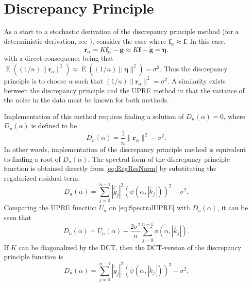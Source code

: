 \documentclass[12pt,notitlepage]{report}
\newcommand{\gnoise}{\widetilde{g}}	%
\newcommand{\gnoiseVec}{\widetilde{\mathbf{g}}}	%
\newcommand{\kMat}{K}	%
\newcommand{\fVec}{\mathbf{f}}	%
\newcommand{\dct}[1]{\breve{#1}}	%
\newcommand{\regparam}{\alpha}
\newcommand{\regf}{\fVec_{\regparam}}	%
\newcommand{\filt}{\phi}
\newcommand{\mfilt}{\psi}
\newcommand{\noise}{\eta}	%
\newcommand{\noiseSD}{\sigma}	%
\newcommand{\noiseVec}{\bm{\noise}}	%
\DeclareMathOperator{\E}{E}	%
\newcommand{\regres}{\mathbf{r}_{\regparam}}	%
\newcommand{\U}{U}	%
\newcommand{\D}{D}	%
\begin{document}
\section{Discrepancy Principle} \label{sec:Discrepancy Principle}
As a start to a stochastic derivation of the discrepancy principle method \cite{Morozov1966} (for a deterministic derivation, see \cite[p.~8-9]{Vogel:2002}), consider the case where $\regf \approx \fVec$. In this case,
\[\regres = \kMat\regf - \gnoiseVec \approx \kMat\fVec - \gnoiseVec = \noiseVec.\]
with a direct consequence being that $\E((1/n)\|\regres\|^2) \approx \E((1/n)\|\noiseVec\|^2) =\noiseSD^2$. Thus the discrepancy principle is to choose $\regparam$ such that $(1/n)\|\regres\|^2 = \noiseSD^2$. A similarity exists between the discrepancy principle and the UPRE method in that the variance of the noise in the data must be known for both methods. \par 
Implementation of this method requires finding a solution of $\D_n(\regparam) = 0$, where $\D_n(\regparam)$ is defined to be
\begin{equation}
\label{eq:DP}
\D_n(\regparam) = \frac{1}{n}\|\regres\|^2 - \noiseSD^2.
\end{equation}
In other words, implementation of the discrepancy principle method is equivalent to finding a root of $\D_n(\regparam)$. The spectral form of the discrepancy principle function is obtained directly from \eqref{eq:RegResNorm} by substituting the regularized residual term:
\begin{equation}
\D_n(\regparam) = \sum_{j = 0}^{n-1} |\widehat{\gnoise}_j|^2(\mfilt(\regparam,|\widehat{k}_j|))^2 - \noiseSD^2.
\label{eq:SpectralDP}
\end{equation}
Comparing the UPRE function $\U_n$ on \eqref{eq:SpectralUPRE} with $\D_n(\regparam)$, it can be seen that
\begin{equation}
\label{eq:UPRE DP Comp}
\D_n(\regparam) = \U_n(\regparam) - \frac{2\noiseSD^2}{n}\sum_{j = 0}^{n-1} \filt(\regparam,|\widehat{k}_j|).
\end{equation}
If $\kMat$ can be diagonalized by the DCT, then the DCT-version of the discrepancy principle function is
\begin{equation}
\D_n(\regparam) = \sum_{j = 0}^{n-1} |\dct{\gnoise}_j|^2(\mfilt(\regparam,|\dct{k}_j|))^2 - \noiseSD^2.
\label{eq:DP DCT}
\end{equation}
\end{document}
